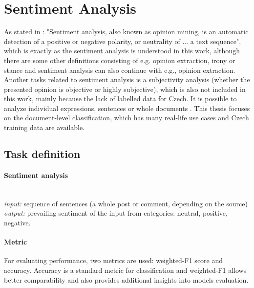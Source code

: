 \section{Sentiment Analysis}
\label{chap:sent}
As stated in \citep{Veselovska}: "Sentiment analysis, also known as opinion mining, is an automatic detection of a positive or negative polarity, or neutrality of ... a text sequence", which is exactly as the sentiment analysis is understood in this work, although there are some other definitions consisting of e.g. opinion extraction, irony or stance \citep{Montoyo2012} and sentiment analysis can also continue with e.g., opinion extraction. Another tasks related to sentiment analysis is a subjectivity analysis (whether the presented opinion is objective or highly subjective), which is also not included in this work, mainly because the lack of labelled data for Czech. It is possible to analyze individual expressions, sentences or whole documents \citep{Veselovska}. This thesis focuses on the document-level classification, which has many real-life use cases and Czech training data are available.
\subsection{Task definition}
\paragraph{Sentiment analysis} \mbox{}\\
\textit{input:} sequence of sentences (a whole post or comment, depending on the source) \\
\textit{output:} prevailing sentiment of the input from categories: neutral, positive, negative.
\par


\paragraph{Metric} For evaluating performance, two metrics are used: weighted-F1 score and accuracy. Accuracy is a standard metric for classification and weighted-F1 allows better comparability and also provides additional insights into models evaluation.

